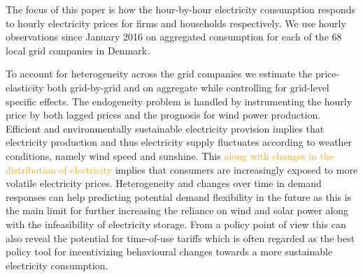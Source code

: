 \label{sec:intro}
The focus of this paper is how the hour-by-hour electricity consumption responds to hourly electricity prices for firms and households respectively. We use hourly observations since January 2016 on aggregated consumption for each of the 68 local grid companies in Denmark.
\par
To account for heterogeneity across the grid companies we estimate the price-elasticity both grid-by-grid and on aggregate while controlling for grid-level specific effects. The endogeneity problem is handled by instrumenting the hourly price by both lagged prices and the prognosis for wind power production.
\medskip\\
Efficient and environmentally sustainable electricity provision implies that electricity production and thus electricity supply fluctuates according to weather conditions, namely wind speed and sunshine. This \textcolor{orange}{along with changes in the distribution of electricity} 
implies that consumers are increasingly exposed to more volatile electricity prices. Heterogeneity and changes over time in demand responses can help predicting potential demand flexibility in the future as this is the main limit for further increasing the reliance on wind and solar power along with the infeasibility of electricity storage. From a policy point of view this can also reveal the potential for time-of-use tariffs which is often regarded as the best policy tool for incentivizing behavioural changes towards a more sustainable electricity consumption.